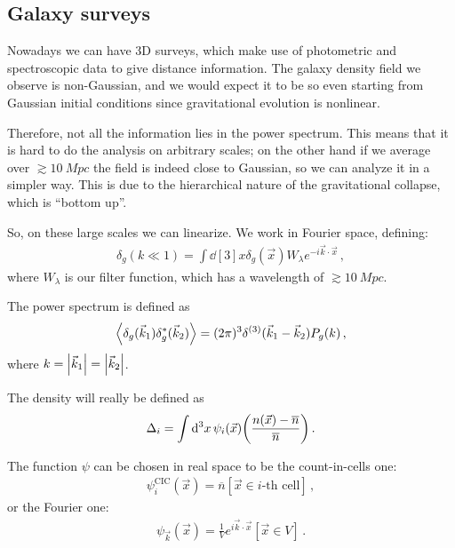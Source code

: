 \documentclass[main.tex]{subfiles}
\begin{document}
\subsection{Galaxy surveys}


Nowadays we can have 3D surveys, which make use of photometric and spectroscopic data to give distance information. 
The galaxy density field we observe is non-Gaussian, and we would expect it to be so even starting from Gaussian initial conditions since gravitational evolution is nonlinear. 

Therefore, not all the information lies in the power spectrum. 
This means that it is hard to do the analysis on arbitrary scales; on the other hand if we average over \(\gtrsim \SI{10}{Mpc}\) the field is indeed close to Gaussian, so we can analyze it in a simpler way.
This is due to the hierarchical nature of the gravitational collapse, which is ``bottom up''. 

So, on these large scales we can linearize. 
We work in Fourier space, defining: 
%
\begin{align}
\delta _g (k \ll 1) = \int \dd[3]{x} \delta _g (\vec{x}) W_\lambda e^{-i \vec{k} \cdot \vec{x}}
\,,
\end{align}
%
where \(W_\lambda \) is our filter function, which has a wavelength of \(\gtrsim \SI{10}{Mpc}\).

The power spectrum is defined as 
%
\begin{align}
\expval{ \delta _g (\vec{k}_1) \delta _g^{*} (\vec{k}_2)} = (2 \pi )^3
\delta^{(3)} (\vec{k}_1 - \vec{k}_2) P_g (k)
\,,
\end{align}
%
where \(k = \abs{\vec{k}_1} = \abs{\vec{k}_2}\).

The density will really be defined as 
%
\begin{align}
\Delta _i = \int \dd[3]{x} \psi _i (\vec{x}) \qty(\frac{n(\vec{x}) - \overline{n}}{\overline{n}})
\,.
\end{align}

The function \(\psi \) can be chosen in real space to be the count-in-cells one: 
%
\begin{align}
\psi^{\text{CIC}}_{i} (\vec{x}) = \overline{n}  [\vec{x} \in i \text{-th cell}]
\,,
\end{align}
%
or the Fourier one: 
%
\begin{align}
\psi_{\vec{k}} (\vec{x}) = \frac{1}{V} e^{i \vec{k} \cdot \vec{x}} [\vec{x} \in V]
\,.
\end{align}
\end{document}
